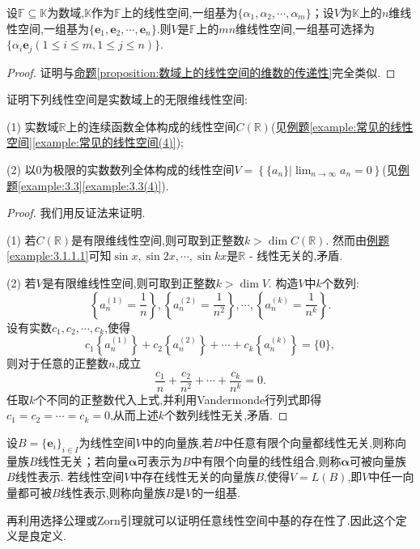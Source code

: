 \documentclass[../../main.tex]{subfiles}%
\begin{document}
\begin{proposition}\label{proposition:数域上的线性空间的基的传递性}
设\(\mathbb{F}\subseteq\mathbb{K}\)为数域,\(\mathbb{K}\)作为\(\mathbb{F}\)上的线性空间,一组基为\(\{\alpha_1,\alpha_2,\cdots,\alpha_m\}\)；设\(V\)为\(\mathbb{K}\)上的\(n\)维线性空间,一组基为\(\{\boldsymbol{e}_1,\boldsymbol{e}_2,\cdots,\boldsymbol{e}_n\}\).则\(V\)是\(\mathbb{F}\)上的\(mn\)维线性空间,一组基可选择为\(\{\alpha_i\boldsymbol{e}_j(1\leqslant  i\leqslant  m,1\leqslant  j\leqslant  n)\}\).
\end{proposition}
\begin{proof}
证明与\hyperref[proposition:数域上的线性空间的维数的传递性]{命题\ref{proposition:数域上的线性空间的维数的传递性}}完全类似.
\end{proof}

\begin{example}
证明下列线性空间是实数域上的无限维线性空间:

(1) 实数域\(\mathbb{R}\)上的连续函数全体构成的线性空间\(C(\mathbb{R})\)(见\hyperref[example:常见的线性空间(4)]{例题\ref{example:常见的线性空间}\ref{example:常见的线性空间(4)}});

(2) 以\(0\)为极限的实数数列全体构成的线性空间\(V = \left\{\{a_n\}|\lim_{n\rightarrow\infty}a_n = 0\right\}\)(见\hyperref[example:3.3(4)]{例题\ref{example:3.3}\ref{example:3.3(4)}}).
\end{example}
\begin{proof}
我们用反证法来证明.

(1) 若\(C(\mathbb{R})\)是有限维线性空间,则可取到正整数\(k>\dim C(\mathbb{R})\). 然而由\hyperref[example:3.1.1.1]{例题\ref{example:3.1.1.1}}可知\(\sin x,\sin 2x,\cdots,\sin kx\)是\(\mathbb{R}\) - 线性无关的,矛盾.

(2) 若\(V\)是有限维线性空间,则可取到正整数\(k>\dim V\). 构造\(V\)中\(k\)个数列:
\[
\left\{a_n^{(1)}=\frac{1}{n}\right\},\left\{a_n^{(2)}=\frac{1}{n^2}\right\},\cdots,\left\{a_n^{(k)}=\frac{1}{n^k}\right\}.
\]
设有实数\(c_1,c_2,\cdots,c_k\),使得
\[
c_1\left\{a_n^{(1)}\right\}+c_2\left\{a_n^{(2)}\right\}+\cdots + c_k\left\{a_n^{(k)}\right\}=\{0\},
\]
则对于任意的正整数\(n\),成立
\[
\frac{c_1}{n}+\frac{c_2}{n^2}+\cdots+\frac{c_k}{n^k}=0.
\]
任取\(k\)个不同的正整数代入上式,并利用Vandermonde行列式即得\(c_1 = c_2=\cdots = c_k = 0\),从而上述\(k\)个数列线性无关,矛盾. 
\end{proof}

\begin{definition}[无限维空间基的定义]\label{definition:无限维空间基的定义}
设\(B = \{ \boldsymbol{e}_i\}_{i\in I}\)为线性空间\(V\)中的向量族,若\(B\)中任意有限个向量都线性无关,则称向量族\(B\)线性无关；若向量\(\boldsymbol{\alpha}\)可表示为\(B\)中有限个向量的线性组合,则称\(\boldsymbol{\alpha}\)可被向量族\(B\)线性表示. 若线性空间\(V\)中存在线性无关的向量族\(B\),使得\(V = L(B)\),即\(V\)中任一向量都可被\(B\)线性表示,则称向量族\(B\)是\(V\)的一组基.
\end{definition}
\begin{note}
再利用选择公理或Zorn引理就可以证明任意线性空间中基的存在性了.因此这个定义是良定义.
\end{note}
\end{document}
